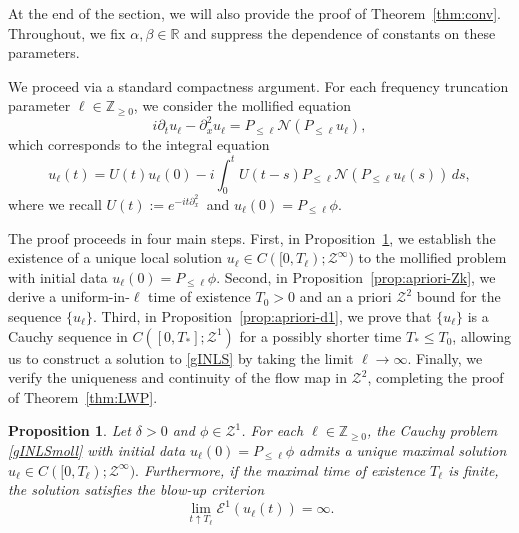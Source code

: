 \documentclass{amsart}
\newtheorem{proposition}{Proposition}[section]
\numberwithin{equation}{section}
\newcommand{\R}{\mathbb{R}}
\newcommand{\Z}{\mathbb{Z}}
\begin{document}
At the end of the section, we will also provide the proof of Theorem~\ref{thm:conv}. Throughout, we fix $\alpha, \beta \in \R$ and suppress the dependence of constants on these parameters.

We proceed via a standard compactness argument. For each frequency truncation parameter $\ell \in \Z_{\geq 0}$, we consider the mollified equation
\begin{equation}\label{gINLSmoll}
i\partial_t u_\ell - \partial_x^2 u_\ell = P_{\leq \ell}\mathcal{N}(P_{\leq \ell}u_\ell),
\end{equation}
which corresponds to the integral equation
\begin{equation}\label{gINLSmoll-int}
u_\ell(t) = U(t)u_\ell(0) - i\int_0^t U(t-s)P_{\leq \ell}\mathcal{N}(P_{\leq \ell}u_\ell(s))\,ds,
\end{equation}
where we recall $U(t):=e^{-it\partial_x^2}\,$ and  $u_\ell(0) = P_{\leq \ell}\phi$. 

The proof proceeds in four main steps. 
First, in Proposition~\ref{prop:LWPmoll}, we establish the existence of a unique local solution  $u_\ell \in C([0,T_\ell); \mathcal{Z}^\infty)$ to the mollified problem with initial data $u_\ell(0) = P_{\leq \ell}\phi$. Second, in Proposition~\ref{prop:apriori-Zk}, we derive a uniform-in-$\ell$ time of existence $T_0 > 0$ and an a priori $\mathcal{Z}^2$ bound for the sequence $\{u_\ell\}$. Third, in Proposition~\ref{prop:apriori-d1}, we prove that $\{u_\ell\}$ is a Cauchy sequence in $C([0,T_*];\mathcal{Z}^1)$ for a possibly shorter time $T_* \leq T_0$, allowing us to construct a solution to \eqref{gINLS} by taking the limit $\ell \to \infty$. Finally, we verify the uniqueness and continuity of the flow map in $\mathcal{Z}^2$, completing the proof of Theorem~\ref{thm:LWP}.

\begin{proposition}\label{prop:LWPmoll}
Let {$\delta>0$ and} $\phi\in \mathcal{Z}^1$. 
 For each $\ell \in \Z_{\geq 0}$, the Cauchy problem \eqref{gINLSmoll} with initial data $u_\ell(0) = P_{\leq \ell}\phi$ admits a unique maximal solution $ u_\ell \in C([0,T_\ell); \mathcal{Z}^\infty). $ Furthermore, if the maximal time of existence $T_\ell$ is finite, the solution satisfies the blow-up criterion
 $$ \lim_{t\uparrow T_\ell} \mathcal{E}^1(u_\ell(t)) = \infty. $$
\end{proposition}
\end{document}
